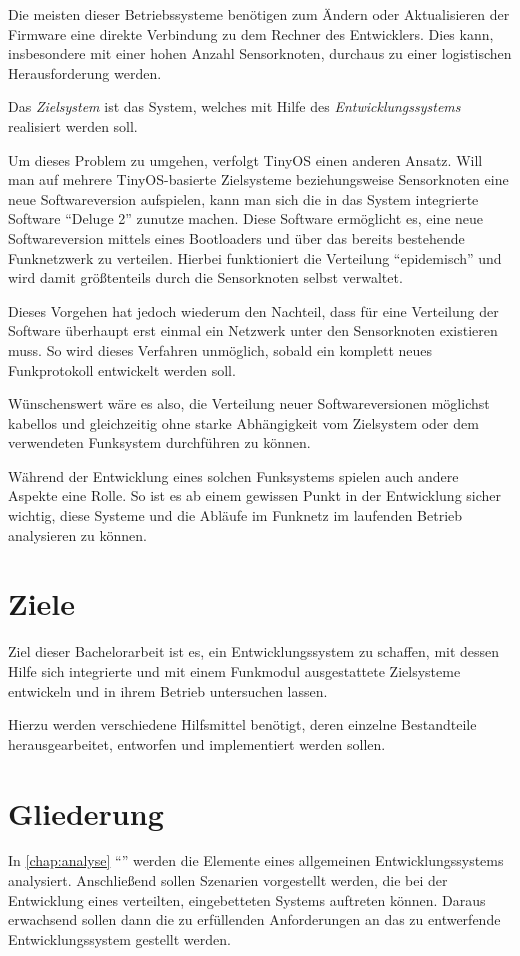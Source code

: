 Die meisten dieser Betriebssysteme benötigen zum Ändern oder
Aktualisieren der Firmware eine direkte Verbindung zu dem Rechner des
Entwicklers. Dies kann, insbesondere mit einer hohen Anzahl Sensorknoten,
durchaus zu einer logistischen Herausforderung werden.

\begin{definition}[Zielsystem]
Das \emph{Zielsystem} ist das System, welches mit Hilfe des
\emph{Entwicklungssystems} realisiert werden soll.
\end{definition}

Um dieses Problem zu umgehen, verfolgt TinyOS einen anderen Ansatz. Will man auf
mehrere TinyOS-basierte Zielsysteme beziehungsweise Sensorknoten eine neue
Softwareversion aufspielen, kann man sich die in das System integrierte Software
"`Deluge 2"'\cite{DELUG} zunutze machen. Diese Software ermöglicht es, eine neue
Softwareversion mittels eines Bootloaders und über das bereits bestehende
Funknetzwerk zu verteilen. Hierbei funktioniert die Verteilung "`epidemisch"'
und wird damit größtenteils durch die Sensorknoten selbst verwaltet.

Dieses Vorgehen hat jedoch wiederum den Nachteil, dass für eine Verteilung der
Software überhaupt erst einmal ein Netzwerk unter den Sensorknoten existieren
muss. So wird dieses Verfahren unmöglich, sobald ein komplett neues
Funkprotokoll entwickelt werden soll.

Wünschenswert wäre es also, die Verteilung neuer Softwareversionen möglichst
kabellos und gleichzeitig ohne starke Abhängigkeit vom Zielsystem oder dem
verwendeten Funksystem durchführen zu können.

Während der Entwicklung eines solchen Funksystems spielen auch andere
Aspekte eine Rolle. So ist es ab einem gewissen Punkt in der Entwicklung sicher
wichtig, diese Systeme und die Abläufe im Funknetz im laufenden Betrieb
analysieren zu können.

\section{Ziele}
Ziel dieser Bachelorarbeit ist es, ein Entwicklungssystem zu schaffen,
mit dessen Hilfe sich integrierte und mit einem Funkmodul ausgestattete
Zielsysteme entwickeln und in ihrem Betrieb untersuchen lassen.

Hierzu werden verschiedene Hilfsmittel benötigt, deren einzelne Bestandteile
herausgearbeitet, entworfen und implementiert werden sollen.
\section{Gliederung}
In \autoref{chap:analyse} "`"' werden die Elemente eines
allgemeinen Entwicklungssystems analysiert. Anschließend sollen Szenarien
vorgestellt werden, die bei der Entwicklung eines verteilten,
eingebetteten Systems auftreten können. Daraus erwachsend sollen
dann die zu erfüllenden Anforderungen an das zu entwerfende
Entwicklungssystem gestellt werden.

